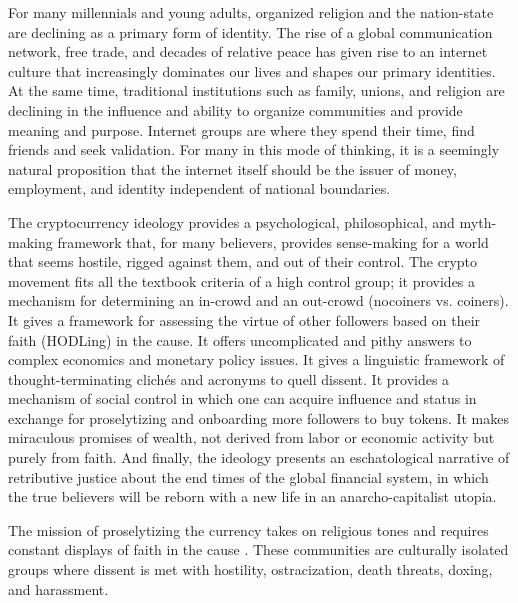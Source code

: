 
For many millennials and young adults, organized religion and the nation-state
are declining as a primary form of identity. The rise of a global communication
network, free trade, and decades of relative peace has given rise to an internet
culture that increasingly dominates our lives and shapes our primary identities.
At the same time, traditional institutions such as family, unions, and religion
are declining in the influence and ability to organize communities and provide
meaning and purpose. Internet groups are where they spend their time, find
friends and seek validation. For many in this mode of thinking, it is a
seemingly natural proposition that the internet itself should be the issuer of
money, employment, and identity independent of national boundaries.

The cryptocurrency ideology provides a psychological, philosophical, and
myth-making framework \cite{faustino_myths_2021} that, for many believers,
provides sense-making for a world that seems hostile, rigged against them, and
out of their control. The crypto movement fits all the textbook criteria of a
high control group; it provides a mechanism for determining an in-crowd and an
out-crowd (nocoiners vs. coiners). It gives a framework for assessing the virtue
of other followers based on their faith (HODLing) in the cause. It offers
uncomplicated and pithy answers to complex economics and monetary policy issues.
It gives a linguistic framework of thought-terminating clichés and acronyms to
quell dissent. It provides a mechanism of social control in which one can
acquire influence and status in exchange for proselytizing and onboarding more
followers to buy tokens. It makes miraculous promises of wealth, not derived
from labor or economic activity but purely from faith. And finally, the ideology
presents an eschatological narrative of retributive justice about the end times
of the global financial system, in which the true believers will be reborn with
a new life in an anarcho-capitalist utopia.


The mission of proselytizing the currency takes on religious tones and requires
constant displays of faith in the cause \cite{golumbia_zealots_2018}. These
communities are culturally isolated groups where dissent is met with hostility,
ostracization, death threats, doxing, and harassment.

